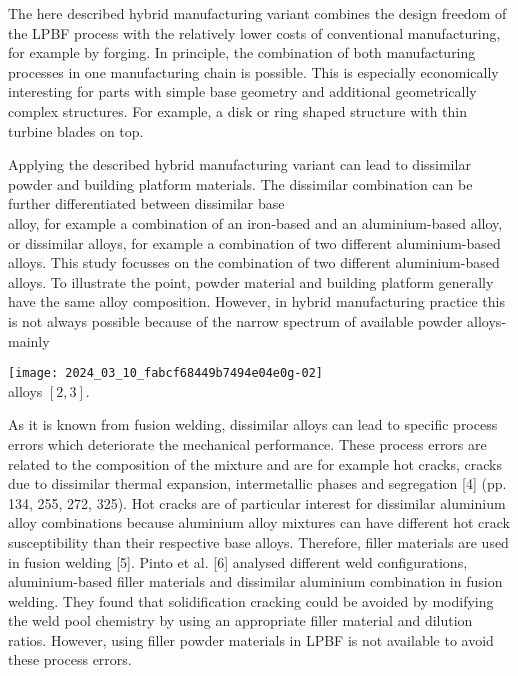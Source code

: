 \documentclass[10pt]{article}
\begin{document}
The here described hybrid manufacturing variant combines the design freedom of the LPBF process with the relatively lower costs of conventional manufacturing, for example by forging. In principle, the combination of both manufacturing processes in one manufacturing chain is possible. This is especially economically interesting for parts with simple base geometry and additional geometrically complex structures. For example, a disk or ring shaped structure with thin turbine blades on top.

Applying the described hybrid manufacturing variant can lead to dissimilar powder and building platform materials. The dissimilar combination can be further differentiated between dissimilar base\\
alloy, for example a combination of an iron-based and an aluminium-based alloy, or dissimilar alloys, for example a combination of two different aluminium-based alloys. This study focusses on the combination of two different aluminium-based alloys. To illustrate the point, powder material and building platform generally have the same alloy composition. However, in hybrid manufacturing practice this is not always possible because of the narrow spectrum of available powder alloys-mainly

\texttt{[image: 2024\_03\_10\_fabcf68449b7494e04e0g-02]}\\
alloys $[2,3]$.

As it is known from fusion welding, dissimilar alloys can lead to specific process errors which deteriorate the mechanical performance. These process errors are related to the composition of the mixture and are for example hot cracks, cracks due to dissimilar thermal expansion, intermetallic phases and segregation [4] (pp. 134, 255, 272, 325). Hot cracks are of particular interest for dissimilar aluminium alloy combinations because aluminium alloy mixtures can have different hot crack susceptibility than their respective base alloys. Therefore, filler materials are used in fusion welding [5]. Pinto et al. [6] analysed different weld configurations, aluminium-based filler materials and dissimilar aluminium combination in fusion welding. They found that solidification cracking could be avoided by modifying the weld pool chemistry by using an appropriate filler material and dilution ratios. However, using filler powder materials in LPBF is not available to avoid these process errors.
\end{document}
